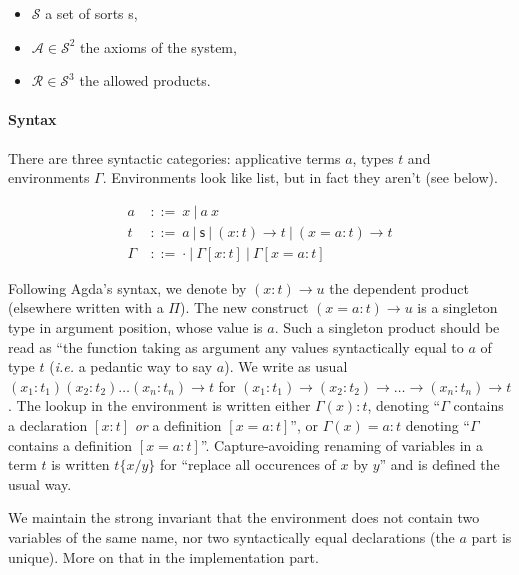 \documentclass[12pt]{article}
\newcommand{\sort}{\textsf{s}}
\newcommand{\gor}{\ |\ }
\newcommand{\gdecl}[2]{{#1}\ &::=\ {#2}}
\newcommand{\subst}[2]{\{#1/#2\}}
\begin{document}
\begin{itemize}
  \item$\mathcal S$ a set of sorts \sort,
  \item$\mathcal A \in \mathcal S^2$ the axioms of the system,
  \item$\mathcal R \in \mathcal S^3$ the allowed products.
\end{itemize}

\paragraph{Syntax} There are three syntactic categories: applicative
terms $a$, types $t$ and environments $\Gamma$. Environments look like
list, but in fact they aren't (see below).

\begin{align*}
 \gdecl{a}{x \gor a\ x } \\
 \gdecl{t}{a \gor \sort \gor (x:t)\to t \gor (x=a:t)\to t} \\
 \gdecl{\Gamma}{\cdot \gor \Gamma[x:t] \gor \Gamma[x=a:t]}
\end{align*}

Following Agda's syntax, we denote by $(x:t)\to u$ the dependent
product (elsewhere written with a $\Pi$). The new construct
$(x=a:t)\to u$ is a singleton type in argument position, whose value
is $a$. Such a singleton product should be read as ``the function
taking as argument any values syntactically equal to $a$ of type $t$
(\emph{i.e.} a pedantic way to say $a$). We write as usual
$(x_1:t_1)(x_2:t_2)\ldots(x_n:t_n)\to t$ for
$(x_1:t_1)\to(x_2:t_2)\to\ldots\to(x_n:t_n)\to t$. The lookup in the
environment is written either $\Gamma(x):t$, denoting ``$\Gamma$
contains a declaration $[x:t]$ \emph{or} a definition $[x=a:t]$'', or
$\Gamma(x)=a:t$ denoting ``$\Gamma$ contains a definition
$[x=a:t]$''. Capture-avoiding renaming of variables in a term $t$ is
written $t\subst{x}{y}$ for ``replace all occurences of $x$ by $y$''
and is defined the usual way.

We maintain the strong invariant that the environment does not contain
two variables of the same name, nor two syntactically equal
declarations (the $a$ part is unique). More on that in the
implementation part.
\end{document}
